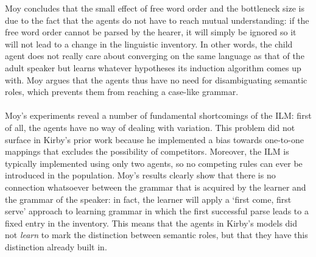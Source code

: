 Moy concludes that the small effect of free word order and the bottleneck size is due to the fact that the agents do not have to reach mutual understanding: if the free word order cannot be parsed by the hearer, it will simply be ignored so it will not lead to a change in the linguistic inventory. In other words, the child agent does not really care about converging on the same language as that of the adult speaker but learns whatever hypotheses its induction algorithm comes up with. Moy argues that the agents thus have no need for disambiguating semantic roles, which prevents them from reaching a case-like grammar.
\\
\\
 Moy's experiments reveal a number of fundamental shortcomings of the ILM: first of all, the agents have no way of dealing with variation. This problem did not surface in Kirby's prior work because he implemented a bias towards one-to-one mappings that excludes the possibility of competitors. Moreover, the ILM is typically implemented using only two agents, so no competing rules can ever be introduced in the population. Moy's results clearly show that there is no connection whatsoever between the grammar that is acquired by the learner and the grammar of the speaker: in fact, the learner will apply a `first come, first serve' approach to learning grammar in which the first successful parse leads to a fixed entry in the inventory. This means that the agents in Kirby's models did not {\em learn} to mark the distinction between semantic roles, but that they have this distinction already built in.

